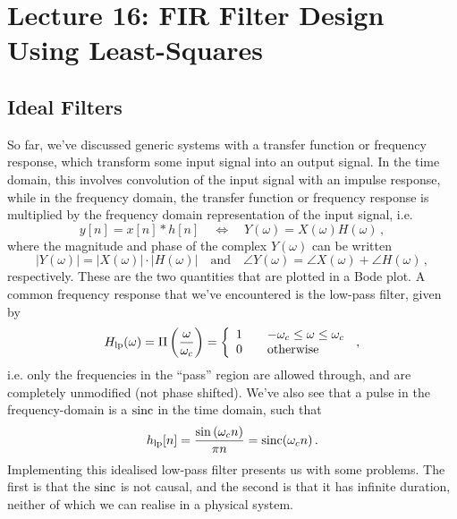 \section{Lecture 16: FIR Filter Design Using Least-Squares}

\subsection{Ideal Filters}
%
So far, we've discussed generic systems with a transfer function or
frequency response, which transform some input signal into an output
signal. In the time domain, this involves convolution of the input
signal with an impulse response, while in the frequency domain, the
transfer function or frequency response is multiplied by the frequency
domain representation of the input signal, i.e.
%
\begin{displaymath}
  y[n] = x[n] * h[n] \quad\Longleftrightarrow\quad
  Y(\omega) = X(\omega)H(\omega) \,,
\end{displaymath}
%
where the magnitude and phase of the complex $Y(\omega)$ can be written
%
\begin{displaymath}
  |Y(\omega)| = |X(\omega)| \cdot |H(\omega)|
  \quad\mathrm{and}\quad
  \angle Y(\omega) = \angle X(\omega) + \angle H(\omega) \,,
\end{displaymath}
%
respectively. These are the two quantities that are plotted in a Bode
plot. A common frequency response that we've encountered is the
low-pass filter, given by
%
\begin{displaymath}
  H_\mathrm{lp}(\omega) = \Pi\left(\frac{\omega}{\omega_c}\right) =
  \left\{\begin{array}{ccl}
  1 & & -\omega_c \leq \omega \leq \omega_c \\
  0 & & \mathrm{otherwise}
  \end{array}\right. \,,
\end{displaymath}
%
i.e. only the frequencies in the ``pass'' region are allowed through,
and are completely unmodified (not phase shifted).
We've also see that a pulse in the frequency-domain is a $\operatorname{sinc}$ in
the time domain, such that
%
\begin{displaymath}
  h_\mathrm{lp}[n] = \frac{\sin\left(\omega_c n\right)}{\pi n}
  = \operatorname{sinc}(\omega_c n) \,.
\end{displaymath}
%
Implementing this idealised low-pass filter presents us with some problems.
The first is that the $\operatorname{sinc}$ is not causal, and the second is that it
has infinite duration, neither of which we can realise in a physical system.\\

